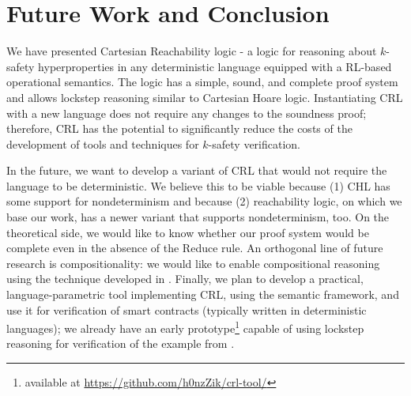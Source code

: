 \section{Future Work and Conclusion}

We have presented Cartesian Reachability logic - a logic for reasoning about $k$-safety hyperproperties
in any deterministic language equipped with a RL-based operational semantics.
The logic has a simple, sound, and complete proof system and allows lockstep reasoning
similar to Cartesian Hoare logic.
Instantiating CRL with a new language does not require any changes to the soundness proof;
therefore, CRL has the potential to significantly reduce the costs of the development of tools and techniques for $k$-safety verification.

In the future, we want to develop a variant of CRL that would not require the language to be deterministic.
We believe this to be viable because (1) CHL has some support for nondeterminism
and because (2) reachability logic, on which we base our work, has a newer variant that supports nondeterminism, too.
On the theoretical side, we would like to know whether our proof system would be complete even in the absence of
the Reduce rule.
An orthogonal line of future research is compositionality: we would like to enable compositional reasoning
using the technique developed in \cite{DOsualdoFD22}.
Finally, we plan to develop a practical, language-parametric tool implementing CRL,
using the \K{} semantic framework, and use it for verification of smart contracts
(typically written in deterministic languages);
we already have an early prototype\footnote{available at \url{https://github.com/h0nzZik/crl-tool/}}
capable of using lockstep reasoning for verification of the example from .
